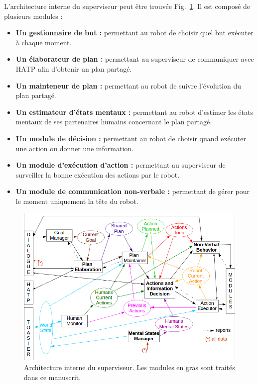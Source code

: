 \documentclass[english,a4paper,11pt,twoside]{StyleThese}
\begin{document}
L'architecture interne du superviseur peut être trouvée Fig.~\ref{fig:archiSup}. Il est composé de plusieurs modules :
\begin{itemize}
\item \textbf{Un gestionnaire de but :} permettant au robot de choisir quel but exécuter à chaque moment.
\item \textbf{Un élaborateur de plan :} permettant au superviseur de communiquer avec HATP afin d'obtenir un plan partagé.
\item \textbf{Un mainteneur de plan :} permettant au robot de suivre l'évolution du plan partagé.
\item \textbf{Un estimateur d'états mentaux :} permettant au robot d'estimer les états mentaux de ses partenaires humains concernant le plan partagé.
\item \textbf{Un module de décision :} permettant au robot de choisir quand exécuter une action ou donner une information.
\item \textbf{Un module d'exécution d'action :} permettant au superviseur de surveiller la bonne exécution des actions par le robot.
\item \textbf{Un module de communication non-verbale :} permettant de gérer pour le moment uniquement la tête du robot.
\end{itemize}

\begin{figure}[!h]
	\centering
    \includegraphics[width=\textwidth]{figs/Chapter2/ArchiSup.png}
    \caption{Architecture interne du superviseur. Les modules en gras sont traités dans ce manuscrit.}
    \label{fig:archiSup}
\end{figure}
\end{document}
